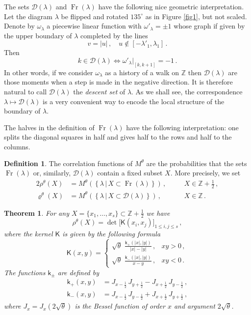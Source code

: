\documentclass[12pt]{amsart}
\newcommand{\la}{\lambda}
\newcommand{\sD}{\mathcal{D}}
\newcommand{\brh}{\boldsymbol{\varrho}}
\newcommand{\Z}{\mathbb{Z}}
\newcommand{\Fr}{\operatorname{Fr}}
\newcommand{\h}{\frac12}
\newcommand{\sh}{{\textstyle \frac12}}
\newcommand{\KK}{\mathsf{K}}
\newcommand{\kk}{\mathsf{k}}
\newcommand{\ix}{\theta}
\theoremstyle{plain}
\newtheorem{theorem}{Theorem}
\theoremstyle{definition}
\newtheorem{definition}[lemma]{Definition}
\numberwithin{equation}{section}
\begin{document}
The sets $\sD(\la)$ and $\Fr(\la)$ have the following nice
geometric interpretation. Let the diagram $\la$ be flipped and
rotated $135^\circ$ as in Figure \ref{fig1}, but not scaled.
Denote by $\omega_\la$
a piecewise linear function with $\omega'_\la=\pm 1$ whose
graph if given by the upper boundary of $\la$ completed by the lines
$$
v=|u|\,, \quad u\notin[-\la'_1,\la_1] \,.
$$
Then 
$$
k\in\sD(\la) \Leftrightarrow \omega'_\la\Big|_{[k,k+1]}=-1 \,.
$$
In other words, if we consider $\omega_\la$ as a history
of a walk on $\Z$ then $\sD(\la)$ are those moments when
a step is made in the negative direction. It is
therefore natural to call $\sD(\la)$ the \emph{descent set}
of $\la$. As we shall see, the correspondence $\la\mapsto\sD(\la)$
is a very convenient way to encode the local structure of the boundary of $\la$. 

The halves in the definition of 
$\Fr(\la)$ have the following  interpretation:
one  splits the diagonal squares in half and gives half to the rows
and half to the columns.  

\begin{definition} The correlation functions of $M^\ix$ are the probabilities
that the sets $\Fr(\la)$ or, similarly, $\sD(\la)$ contain a fixed
subset $X$. More precisely, we set
%
\begin{alignat}{2}
\rho^\ix(X)&= M^\ix\left(\left\{\la\,|\, X\subset \Fr(\la)\right\} 
\right)\,,\quad &&X\in\Z+\sh\,,\label{e11a}\\
\brh^\ix(X)&= M^\ix\left(\left\{\la\,|\, X\subset \sD(\la)\right\} 
\right)\,,\quad &&X\in\Z\,. \label{e0006}
\end{alignat}
%
\end{definition}

\begin{theorem}\label{t1}
For any $X=\{x_1,\dots,x_s\}\subset \Z+\sh$
we have 
%
\begin{equation*}
\rho^\ix(X)=
\det \Big[\KK(x_i,x_j)\Big]_{1\le i,j \le s}\,,
\end{equation*}
%
where the kernel $\KK$ is given by the following formula
%
\begin{equation}\label{e12a}
\KK(x,y)=\left\{
\begin{array}{ll}
\displaystyle
\sqrt{\ix}\,\,\frac{\kk_+(|x|,|y|)}{|x|-|y|}\,, & xy >0 \,,\\[10pt]
\displaystyle \sqrt{\ix}\,\,\frac{\kk_-(|x|,|y|)}{x-y} \,, & xy<0 \,.
\end{array}
\right. 
\end{equation}
%
The functions $\kk_\pm$ are defined by
%
\begin{align}\label{e12} 
\kk_+(x,y)&= 
J_{x-\h}\, J_{y+\h}  - J_{x+\h} \, J_{y-\h} \,, \\ 
\kk_-(x,y)&= J_{x-\h}\, J_{y-\h}  + J_{x+\h} \, J_{y+\h} \label{e13}\,,
\end{align}
%
where $J_x=J_x(2\sqrt{\ix})$ is the Bessel function of
order $x$ and argument $2\sqrt{\ix}$. 
\end{theorem}
\end{document}
